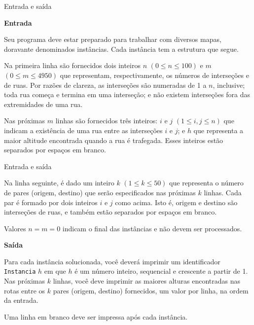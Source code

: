 \begin{frame}[fragile]{Entrada e saída}

\textbf{Entrada}

Seu programa deve estar preparado para trabalhar com diversos mapas, doravante denominados 
instâncias. Cada instância tem a estrutura que segue.

Na primeira linha são fornecidos dois inteiros $n$ $(0\leq n\leq 100)$ e $m$ $(0\leq m \leq 4950)$ 
que representam, respectivamente, os números de interseções e de ruas. Por razões de clareza, as 
interseções são numeradas de 1 a $n$, inclusive; toda rua começa e termina em uma interseção; e 
não existem interseções fora das extremidades de uma rua.

Nas próximas $m$ linhas são fornecidos três inteiros: $i$ e $j$ $(1\leq i, j\leq n)$ que indicam a 
existência de uma rua entre as interseções $i$ e $j$; e $h$ que representa a maior altitude 
encontrada quando a rua é trafegada. Esses inteiros estão separados por espaços em branco.

\end{frame}

\begin{frame}[fragile]{Entrada e saída}

Na linha seguinte, é dado um inteiro $k$ $(1\leq k\leq 50)$ que representa o número de pares 
(origem, destino) que serão especificados nas próximas $k$ linhas. Cada par é formado por dois 
inteiros $i$ e $j$ como acima. Isto é, origem e destino são interseções de ruas, e também estão 
separados por espaços em branco.

Valores $n = m = 0$ indicam o final das instâncias e não devem ser processados.

\textbf{Saída}

Para cada instância solucionada, você deverá imprimir um identificador \texttt{Instancia} $h$ em 
que $h$ é um número inteiro, sequencial e crescente a partir de 1. Nas próximas $k$ linhas, você 
deve imprimir as maiores alturas encontradas nas rotas entre os $k$ pares (origem, destino) 
fornecidos, um valor por linha, na ordem da entrada.

Uma linha em branco deve ser impressa após cada instância.

\end{frame}

